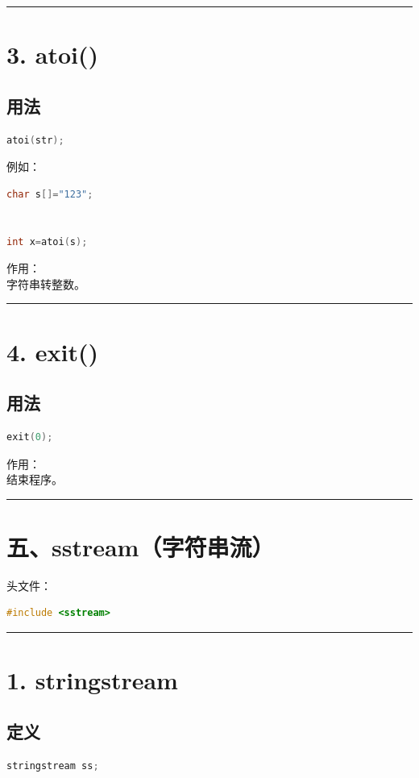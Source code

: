 \documentclass[9pt,twocolumn]{extarticle}
\begin{document}
\noindent\rule{\linewidth}{0.4pt}

\section{3. atoi()}

\subsection{用法}
\begin{lstlisting}[language=C++]
atoi(str);
\end{lstlisting}
例如：
\begin{lstlisting}[language=C++]
char s[]="123";


int x=atoi(s);
\end{lstlisting}
作用：\\
字符串转整数。

\noindent\rule{\linewidth}{0.4pt}

\section{4. exit()}

\subsection{用法}
\begin{lstlisting}[language=C++]
exit(0);
\end{lstlisting}
作用：\\
结束程序。

\noindent\rule{\linewidth}{0.4pt}

\section{五、sstream（字符串流）}

头文件：
\begin{lstlisting}[language=C++]
#include <sstream>
\end{lstlisting}

\noindent\rule{\linewidth}{0.4pt}

\section{1. stringstream}

\subsection{定义}
\begin{lstlisting}[language=C++]
stringstream ss;
\end{lstlisting}
\end{document}
